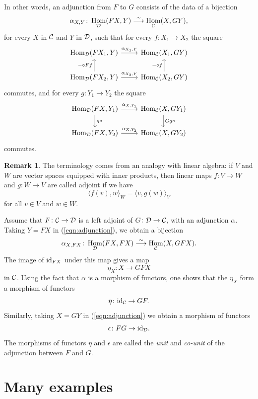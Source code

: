 \documentclass[11pt]{amsbook}
\newcommand{\longisomto}{\overset{\sim}{\longrightarrow}}
\DeclareMathOperator\Hom{Hom}
\def\id{{\rm id}}
\theoremstyle{plain}
\theoremstyle{definition}
\newtheorem{remark}[theorem]{Remark}
\begin{document}
In other words, an adjunction from $F$ to $G$ consists of the data of a bijection
\begin{equation}\label{eqn:adjunction}
	\alpha_{X,Y}\colon \Hom_\cD( FX, Y ) \longisomto \Hom_\cC( X, GY ),
\end{equation}
for every $X$ in ${\mathcal{C}}$ and $Y$ in ${\mathcal{D}}$, such that for every $f\colon X_1\to X_2$ the square
\[
\begin{tikzcd}
\Hom_\cD( FX_1, Y ) \arrow{r}{\alpha_{X_1,Y}} & \Hom_\cC( X_1, GY ) \\
\Hom_\cD( FX_2, Y ) \arrow{r}{\alpha_{X_2,Y}} \arrow{u}{-\circ Ff}
	 & \Hom_\cC( X_2, GY ) \arrow{u}{-\circ f}
\end{tikzcd}
\]
commutes, and for every $g\colon Y_1\to Y_2$ the square
\[
\begin{tikzcd}
\Hom_\cD( FX, Y_1 ) \arrow{r}{\alpha_{X,Y_1}}  \arrow{d}{g\circ-}
	& \Hom_\cC( X, GY_1 ) \arrow{d}{Gg\circ -} \\
\Hom_\cD( FX, Y_2 ) \arrow{r}{\alpha_{X,Y_2}}
	 & \Hom_\cC( X, GY_2 )
\end{tikzcd}
\]
commutes. 

\begin{remark}
The terminology comes from an analogy with linear algebra: if $V$ and $W$ are vector spaces equipped with inner products, then linear maps $f\colon V\to W$ and $g\colon W\to V$ are called adjoint if we have
\[
	\langle f(v), w \rangle_W = \langle v, g(w) \rangle_V
\]
for all $v\in V$ and $w\in W$.
\end{remark}


Assume that $F\colon {\mathcal{C}} \to {\mathcal{D}}$ is a left adjoint of $G\colon {\mathcal{D}} \to {\mathcal{C}}$, with an adjunction $\alpha$. 
Taking $Y=FX$ in (\ref{eqn:adjunction}), we obtain a bijection 
\[
	\alpha_{X,FX}\colon \Hom_\cD(FX,FX) \longisomto \Hom_\cC(X,GFX).
\]
The image of $\id_{FX}$ under this map gives a map
\[
	\eta_X \colon X \to GFX
\]
in ${\mathcal{C}}$. Using the fact that $\alpha$ is a morphism of functors, one shows that the $\eta_X$ form a morphism of functors
\[
	\eta\colon \id_\cC \to GF.
\]
Similarly, taking $X=GY$ in (\ref{eqn:adjunction}) we obtain a morphism of functors
\[
	\epsilon\colon FG \to \id_\cD.
\]
The morphisms of functors $\eta$ and $\epsilon$ are called the \emph{unit} and \emph{co-unit} of the adjunction between $F$ and $G$.


\section{Many examples}
\end{document}
